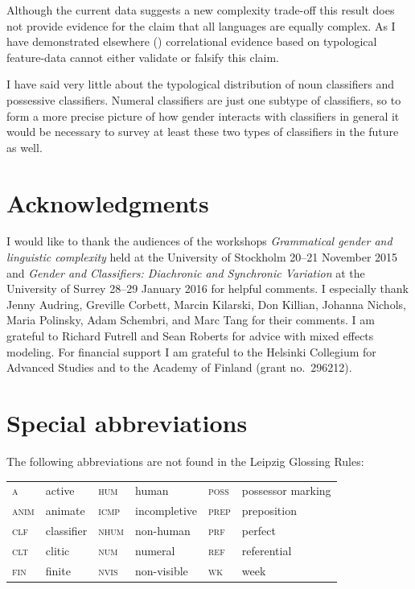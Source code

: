\documentclass[output=collectionpaper]{langsci/langscibook}
\begin{document}
Although the current data suggests a new complexity trade-off this result does not provide evidence for the claim that all languages are equally complex. As I have demonstrated elsewhere (\citealt{Sinnemaeki2014a}) correlational evidence based on typological feature-data cannot either validate or falsify this claim.

I have said very little about the typological distribution of noun classifiers and possessive classifiers. Numeral classifiers are just one subtype of classifiers, so to form a more precise picture of how gender interacts with classifiers in general it would be necessary to survey at least these two types of classifiers in the future as well.

\section*{Acknowledgments}

I would like to thank the audiences of the workshops \textit{Grammatical gender and linguistic complexity} held at the University of Stockholm 20--21 November 2015 and \textit{Gender and Classifiers: Diachronic and Synchronic Variation} at the University of Surrey 28--29 January 2016 for helpful comments. I especially thank Jenny Audring, Greville Corbett, Marcin Kilarski, Don Killian, Johanna Nichols, Maria Polinsky, Adam Schembri, and Marc Tang for their comments. I am grateful to Richard Futrell and Sean Roberts for advice with mixed effects modeling. For financial support I am grateful to the Helsinki Collegium for Advanced Studies and to the Academy of Finland (grant no.~296212).

\section*{Special abbreviations}
\largerpage
\noindent The following abbreviations are not found in the Leipzig Glossing Rules:
\medskip

\begin{tabular}{@{}llllll@{}}
  \textsc{a}	&	active	&	\textsc{hum}	&	human	&	\textsc{poss}	&	possessor marking	\\
  \textsc{anim}	&	animate	&	\textsc{icmp}	&	incompletive	&	\textsc{prep}	&	preposition	\\
  \textsc{clf}	&	classifier	&	\textsc{nhum}	&	non-human	&	\textsc{prf}	&	perfect	\\
  \textsc{clt}	&	clitic	&	\textsc{num}	&	numeral	&	\textsc{ref}	&	referential	\\
  \textsc{fin}	&	finite	&	\textsc{nvis}	&	non-visible	&	\textsc{wk}	&	week	\\
\end{tabular}
\end{document}
